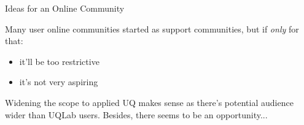 \documentclass[]{rsuqbeamernew}
\begin{document}
\begin{frame}[t]{Ideas for an Online Community}

Many user online communities started as support communities, but if \emph{only} for that:
\begin{itemize}
  \item it'll be too restrictive %
  \item it's not very aspiring
\end{itemize}
Widening the scope to applied UQ makes sense as there's potential audience wider than UQLab users.
Besides, there seems to be an opportunity...

\end{frame}
\end{document}
